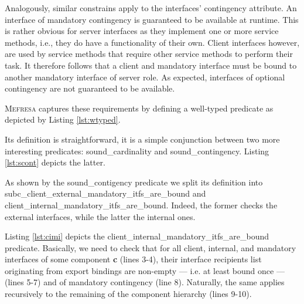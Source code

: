 		Analogously, similar constrains apply to the \textsf{interface}s' \textsf{contingency} attribute. An \textsf{interface} 
	of \textsf{mandatory}	\textsf{contingency}  is guaranteed to be available at runtime. This is rather obvious for \textsf{server}
	\textsf{interface}s as they implement one or more service methods, i.e., they do have a functionality of their own. \textsf{Client}
	\textsf{interface}s however, are used by service methods that require other service methods to perform their task. It therefore follows
	that a \textsf{client} and \textsf{mandatory} \textsf{interface} must be bound to another \textsf{mandatory} \textsf{interface} of
	\textsf{server} \textsf{role}.  As expected, \textsf{interface}s of \textsf{optional} \textsf{contingency} are not guaranteed to be available.
			
	\textsc{Mefresa} captures these requirements by defining a well-typed predicate as depicted by Listing \ref{lst:wtyped}.


	

	\noindent  Its definition is straightforward, it is a simple conjunction between two more interesting 
	predicates: \textsf{sound\_cardinality} and \textsf{sound\_contingency}. Listing \ref{lst:scont} depicts the latter.
	
		
	
	
  \noindent As shown by the \textsf{sound\_contigency} predicate we split its definition
		into \textsf{subc\_client\_external\_mandatory\_itfs\_are\_bound} 
       and \textsf{client\_internal\_mandatory\_itfs\_are\_bound}. Indeed,	the former checks the \textsf{external}
       \textsf{interfaces}, while the latter the \textsf{internal} ones. 
           
       
	       
       
      Listing \ref{lst:cimi} depicts the \textsf{client\_internal\_mandatory\_itfs\_are\_bound} predicate.      
      Basically, we need to check that for all \textsf{client}, \textsf{internal}, and
       \textsf{mandatory} \textsf{interfaces} of some \textsf{component} \textbf{c} (lines 3-4), 
       their \textsf{interface} recipients list originating from \textsf{export bindings} 
       are non-empty --- i.e. at least bound once --- (lines 5-7) and of \textsf{mandatory} \textsf{contingency} (line 8). 	
	   Naturally, the same applies recursively to the remaining of the \textsf{component} hierarchy (lines 9-10).	
	
